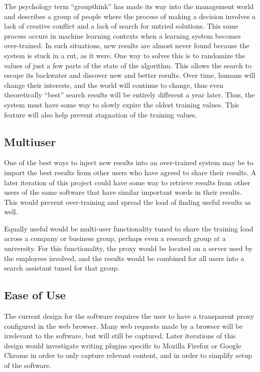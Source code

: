 \documentclass[12pt]{article}
\begin{document}
The psychology term ``groupthink'' has made its way into the management world and describes a group of people
where the process of making a decision involves a lack of creative conflict and a lack of search for untried
solutions. This same process occurs in machine learning contexts when a learning system becomes
over-trained. In such situations, new results are almost never found because the system is stuck in a rut, as
it were. One way to solves this is to randomize the values of just a few parts of the state of the
algorithm. This allows the search to escape its backwater and discover new and better results.  Over time,
humans will change their interests, and the world will continue to change, thus even theoretically ``best''
search results will be entirely different a year later.  Thus, the system must have some way to slowly expire
the oldest training values. This feature will also help prevent stagnation of the training values.
\subsection{Multiuser}
One of the best ways to inject new results into an over-trained system may be to import the best results from
other users who have agreed to share their results. A later iteration of this project could have some way to
retrieve results from other users of the same software that have similar important words in their
results. This would prevent over-training and spread the load of finding useful results as well.

Equally useful would be multi-user functionality tuned to share the training load across a company or
business group, perhaps even a research group at a university. For this functionality, the proxy would be
located on a server used by the employees involved, and the results would be combined for all users into a
search assistant tuned for that group.
\subsection{Ease of Use}
The current design for the software requires the user to have a transparent proxy configured in the web
browser.  Many web requests made by a browser will be irrelevant to the software, but will still be captured.
Later iterations of this design would investigate writing plugins specific to Mozilla Firefox or Google Chrome
in order to only capture relevant content, and in order to simplify setup of the software.

\pagebreak{}
 
\end{document}
